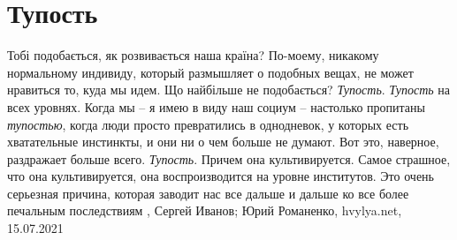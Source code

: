  
 
 
 
 
\chapter{Тупость}

Тобі подобається, як розвивається наша країна?  По-моему, никакому нормальному
индивиду, который размышляет о подобных вещах, не может нравиться то, куда мы
идем.  Що найбільше не подобається?  \emph{Тупость}. \emph{Тупость} на всех
уровнях. Когда мы – я имею в виду наш социум – настолько пропитаны
\emph{тупостью}, когда люди просто превратились в однодневок, у которых есть
хватательные инстинкты, и они ни о чем больше не думают. Вот это, наверное,
раздражает больше всего.  \emph{Тупость}. Причем она культивируется. Самое
страшное, что она культивируется, она воспроизводится на уровне институтов. Это
очень серьезная причина, которая заводит нас все дальше и дальше ко все более
печальным последствиям
, 
Сергей Иванов; Юрий Романенко, hvylya.net, 15.07.2021

